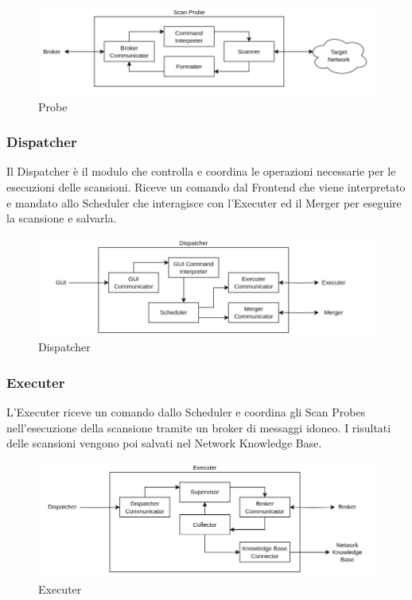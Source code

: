 \documentclass[target=bach,aauheader=,style=]{thud}
\begin{document}
\begin{figure}[h]
  \includegraphics[width=\columnwidth]{probe}
  \centering
  \caption{Probe}
  \label{probe}
\end{figure}
\FloatBarrier


\subsubsection{Dispatcher} 
Il Dispatcher è il modulo che controlla e coordina le operazioni necessarie per le esecuzioni delle scansioni.
Riceve un comando dal Frontend che viene interpretato e mandato allo Scheduler che interagisce con l'Executer ed il Merger per eseguire la scansione e salvarla.

\begin{figure}[h]
  \includegraphics[width=\columnwidth]{dispatcher}
  \centering
  \caption{Dispatcher}
  \label{dispatcher}
\end{figure}

\FloatBarrier

\subsubsection{Executer} 
L'Executer riceve un comando dallo Scheduler e coordina gli Scan Probes nell'esecuzione della scansione tramite un broker di messaggi idoneo. I risultati delle scansioni vengono poi salvati nel Network Knowledge Base.

\begin{figure}[h]
  \includegraphics[width=\columnwidth]{executer}
  \centering
  \caption{Executer}
  \label{executer}
\end{figure}
\end{document}
